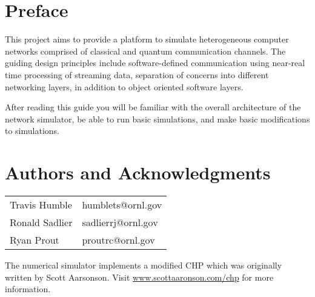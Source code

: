 \documentclass[letterpaper,twoside=false]{scrbook}
\begin{document}
\title{\documentTitle}
\date{\documentVersion}
\maketitle
\tableofcontents

\chapter{Preface}
This project aims to provide a platform to simulate heterogeneous computer networks comprised of classical and quantum communication channels. The guiding design principles include software-defined communication using near-real time processing of streaming data, separation of concerns into different networking layers, in addition to object oriented software layers.

After reading this guide you will be familiar with the overall architecture of the network simulator, be able to run basic simulations, and make basic modifications to simulations.

\chapter{Authors and Acknowledgments}
\begin{tabular}{ l l }
	Travis Humble & humblets@ornl.gov \\
	Ronald Sadlier & sadlierrj@ornl.gov \\
	Ryan Prout & proutrc@ornl.gov
\end{tabular}

The numerical simulator implements a modified CHP which was originally written  by Scott Aarsonson. Visit \url{www.scottaaronson.com/chp} for more information.
\end{document}
